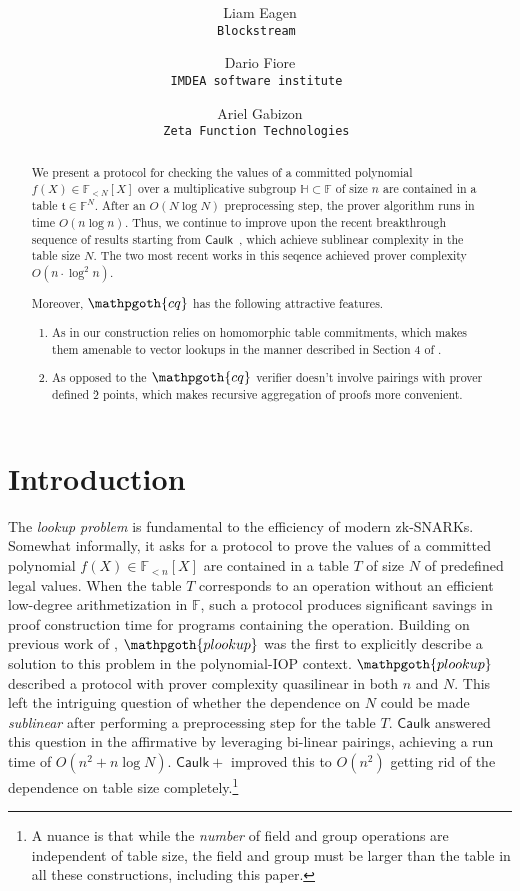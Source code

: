\documentclass[11pt]{article} %
\title{ \bf \papertitle \\[0.72cm]}
\author{ Liam Eagen \\ \tt{Blockstream} \and  Dario Fiore \\ \tt{IMDEA software institute}  \and Ariel Gabizon \\ \tt{Zeta Function Technologies} }
\newcommand{\cq}{\ensuremath{\mathpgoth{cq} }\xspace}
\newcommand{\caulkp}{\ensuremath{\mathsf{\mathrel{Caulk}\mathrel{\scriptstyle{+}}}}\xspace}
\newcommand{\caulk}{\ensuremath{\mathsf{Caulk}}\xspace}
\newcommand{\plookup}{\ensuremath{\mathpgoth{plookup}}\xspace}
\newcommand{\F}{\ensuremath{\mathbb F}\xspace}
\newcommand{\polysofdeg}[1]{\ensuremath{\F_{< #1}[X]}\xspace}
\newcommand{\subspace}{\ensuremath{\mathbb{H}}\xspace}
\newcommand{\witsize}{\ensuremath{n}\xspace}
\newcommand{\tabsize}{\ensuremath{N}\xspace}
\newcommand{\tab}{\ensuremath{\mathfrak{t}}\xspace}
\begin{document}
    \maketitle
\begin{abstract}
 We present a protocol for checking the values of a committed polynomial $f(X)\in \polysofdeg{\tabsize}$ over a multiplicative subgroup $\subspace\subset \F$ of size \witsize are contained in a
 table $\tab\in \F^\tabsize$. After an $O(\tabsize \log \tabsize)$ preprocessing step, the prover algorithm runs in time $O(\witsize\log \witsize)$.
 Thus, we continue to improve upon the recent breakthrough sequence of results\cite{caulk,caulkp,flookup,baloo} starting from \caulk~\cite{caulk}, which achieve sublinear complexity in the table size \tabsize. The two most recent works in this seqence \cite{flookup,baloo} achieved
 prover complexity $O(\witsize\cdot \log^2 \witsize)$.
 
 Moreover, \cq has the following attractive features.
 \begin{enumerate}
  \item As in \cite{caulk,caulkp,baloo} our construction relies on homomorphic table commitments, which makes them amenable to vector lookups in the manner described in Section 4 of \cite{plookup}.
 \item As opposed to \cite{caulk,caulkp,flookup,baloo} the \cq verifier doesn't involve pairings with prover defined \G2 points, which makes recursive aggregation of proofs more convenient.
 \end{enumerate}
 \end{abstract}


\section{Introduction}
The \emph{lookup problem} is fundamental to the efficiency of modern zk-SNARKs.
Somewhat informally, it asks for a protocol to prove the values of a committed polynomial $f(X)\in\polysofdeg{\witsize}$ are contained in a table $T$ of size $\tabsize$ of predefined legal values.
When the table $T$ corresponds to an operation without an efficient low-degree arithmetization in $\F$, such a protocol produces significant savings in proof construction time for programs containing the operation.
Building on previous work of \cite{arya}, \plookup \cite{plookup} was the first to explicitly describe a solution to this problem in the polynomial-IOP context. \plookup described a protocol with prover complexity quasilinear in both \witsize and \tabsize.
This left the intriguing question of whether the dependence on \tabsize could be made \emph{sublinear} after performing a preprocessing step for the table $T$.
\caulk \cite{caulk} answered this question in the affirmative by leveraging bi-linear pairings, achieving a run time of $O(\witsize^2+\witsize\log \tabsize)$. \caulkp \cite{caulkp} improved this to $O(\witsize^2)$ getting rid of the dependence on table size completely.\footnote{A nuance is that while the \emph{number} of field and group operations are independent of table size, the field and group must be larger than the table in all these constructions, including this paper.} 
\end{document}
